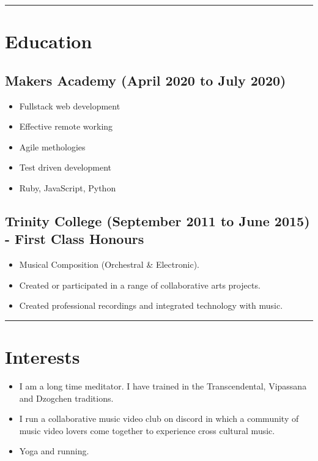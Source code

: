 \documentclass[12pt]{IEEEtran}
\newcommand{\cvrule}{\noindent\rule{8.5cm}{0.4pt}}
\begin{document}
\cvrule


\section*{\textbf{Education}}

\subsection*{Makers Academy (April 2020 to July 2020)}

\begin{itemize}
\item Fullstack web development
\item Effective remote working
\iffalse
\item Object oritened design
\fi
\item Agile methologies
\item Test driven development
\item Ruby, JavaScript, Python
\end{itemize}

\subsection*{Trinity College (September 2011 to June 2015) - First Class Honours}
\begin{itemize}
\item Musical Composition (Orchestral \& Electronic).
\item Created or participated in a range of collaborative arts projects.
\item Created professional recordings and integrated technology with music.
\end{itemize}

\cvrule


\section*{I\textbf{nterests}}

\begin{itemize}
\item I am a long time meditator. I have trained in the Transcendental, Vipassana and Dzogchen traditions.
\item I run a collaborative music video club on discord in which a community of music video lovers come together to experience cross cultural music.
\iffalse
\item I play music regularly (Grade 8 in Baroque Recorder).
\fi
\item Yoga and running.
\end{itemize}
\end{document}
